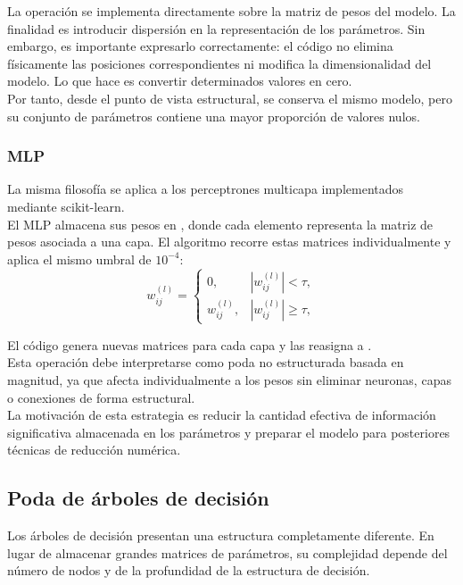 \documentclass[a4paper,12pt,twoside,final]{book}
\begin{document}
La operación se implementa directamente sobre la matriz de pesos del modelo. La finalidad es introducir dispersión en
la representación de los parámetros. Sin embargo, es importante expresarlo correctamente: el código no elimina
físicamente las posiciones correspondientes ni modifica la dimensionalidad del modelo. Lo que hace es convertir
determinados valores en cero.\\

Por tanto, desde el punto de vista estructural, se conserva el mismo modelo, pero su conjunto de parámetros contiene
una mayor proporción de valores nulos.

\subsubsection{MLP}
La misma filosofía se aplica a los perceptrones multicapa implementados mediante scikit-learn.\\

El MLP almacena sus pesos en , donde cada elemento representa la matriz de pesos asociada a una capa. El
algoritmo recorre estas matrices individualmente y aplica el mismo umbral de $10^{-4}$:
\[
w_{ij}^{(l)} =
\begin{cases}
0, & \left|w_{ij}^{(l)}\right| < \tau, \\
w_{ij}^{(l)}, & \left|w_{ij}^{(l)}\right| \geq \tau,
\end{cases}
\]

El código genera nuevas matrices para cada capa y las reasigna a .\\

Esta operación debe interpretarse como poda no estructurada basada en magnitud, ya que afecta individualmente a los
pesos sin eliminar neuronas, capas o conexiones de forma estructural.\\

La motivación de esta estrategia es reducir la cantidad efectiva de información significativa almacenada en los
parámetros y preparar el modelo para posteriores técnicas de reducción numérica.

\subsection{Poda de árboles de decisión}
Los árboles de decisión presentan una estructura completamente diferente. En lugar de almacenar grandes matrices de
parámetros, su complejidad depende del número de nodos y de la profundidad de la estructura de decisión.\\
\end{document}

